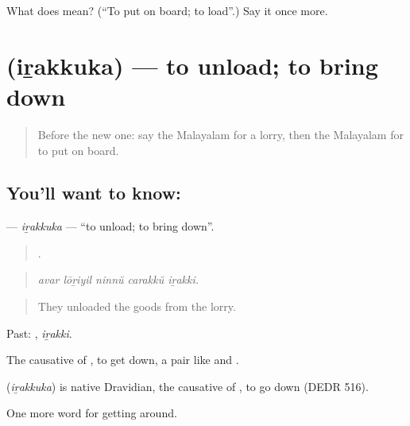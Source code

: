 \begin{tcolorbox}[breakable,colback=teal!4,colframe=teal!35!black,title={Before you move on}]
What does  mean? (\textquotedblleft{}To put on board; to load\textquotedblright{}.) Say it once more.
\end{tcolorbox}
\section[\texorpdfstring{\ml{ഇറക്കുക} (iṟakkuka)}{ഇറക്കുക (iṟakkuka)}]{ (iṟakkuka) — to unload; to bring down}

\label{lesson:ML-C467-irakkuka}



\begin{quote}
Before the new one: say the Malayalam for a lorry, then the Malayalam for to put on board.
\end{quote}

\subsection*{You'll want to know: }
\textbf{} — \emph{iṟakkuka} — \textquotedblleft{}to unload; to bring down\textquotedblright{}.

\begin{quote}
    .
\end{quote}

\begin{quote}
\emph{avar lōṟiyil ninnŭ carakkŭ iṟakki.}
\end{quote}

\begin{quote}
They unloaded the goods from the lorry.
\end{quote}

Past: , \emph{iṟakki}.

The causative of , to get down, a pair like  and .

\begin{cousinweb}
\textbf{} (\emph{iṟakkuka}) is native Dravidian, the causative of , to go down (DEDR 516).
\end{cousinweb}

\begin{grammarlens}[title={What you've built}]
One more word for getting around.
\end{grammarlens}

